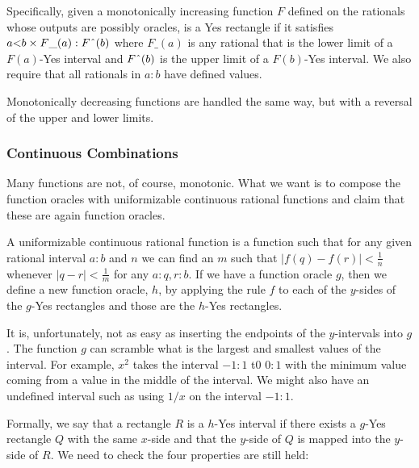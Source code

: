 \documentclass[12pt]{article}
\theoremstyle{remark}
\newcommand{\lt}{\mathord{<}}
\begin{document}
Specifically, given a monotonically increasing function $F$ defined on the rationals whose outputs are possibly oracles, is a Yes rectangle if it satisfies  $a \lt b \times F\_(a):F\string^ (b)$  where $F\_(a)$ is any rational that is the lower limit of a $F(a)$-Yes interval and $F\string^ (b)$ is the upper limit of a $F(b)$-Yes interval. We also require that all rationals in $a:b$ have defined values. 

Monotonically decreasing functions are handled the same way, but with a reversal of the upper and lower limits. 

\subsubsection{Continuous Combinations}

Many functions are not, of course, monotonic. What we want is to compose the function oracles with uniformizable continuous rational functions and claim that these are again function oracles. 

A uniformizable continuous rational function is a function such that for any given rational interval $a:b$ and $n$ we can find an $m$ such that $|f(q) - f(r)| < \frac{1}{n} $ whenever $|q-r| < \frac{1}{m}$ for any $a:q,r:b$. If we have a function oracle $g$, then we define a new function oracle, $h$, by applying the rule $f$ to each of the $y$-sides of the $g$-Yes rectangles and those are the $h$-Yes rectangles. 

It is, unfortunately, not as easy as inserting the endpoints of the $y$-intervals into $g$. The function $g$ can scramble what is the largest and smallest values of the interval. For example, $x^2$ takes the interval $-1:1$ t0 $0:1$ with the minimum value coming from a value in the middle of the interval. We might also have an undefined interval such as using $1/x$ on the interval $-1:1$.

Formally, we say that a rectangle $R$ is a $h$-Yes interval if there exists a $g$-Yes rectangle $Q$ with the same $x$-side and that the $y$-side of $Q$ is mapped into the $y$-side of $R$. We need to check the four properties are still held: 
\end{document}
